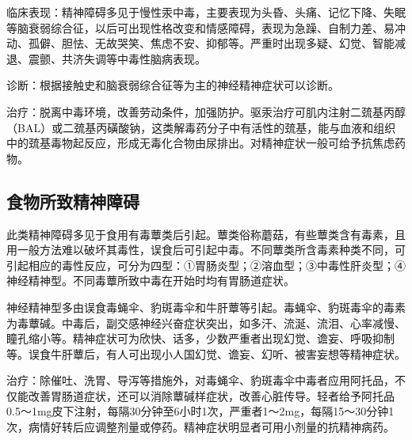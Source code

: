 临床表现：精神障碍多见于慢性汞中毒，主要表现为头昏、头痛、记忆下降、失眠等脑衰弱综合征，以后可出现性格改变和情感障碍，表现为急躁、自制力差、易冲动、孤僻、胆怯、无故哭笑、焦虑不安、抑郁等。严重时出现多疑、幻觉、智能减退、震颤、共济失调等中毒性脑病表现。

诊断：根据接触史和脑衰弱综合征等为主的神经精神症状可以诊断。

治疗：脱离中毒环境，改善劳动条件，加强防护。驱汞治疗可肌内注射二巯基丙醇（BAL）或二巯基丙磺酸钠，这类解毒药分子中有活性的巯基，能与血液和组织中的巯基毒物起反应，形成无毒化合物由尿排出。对精神症状一般可给予抗焦虑药物。

\subsection{食物所致精神障碍}

此类精神障碍多见于食用有毒蕈类后引起。蕈类俗称蘑菇，有些蕈类含有毒素，且用一般方法难以破坏其毒性，误食后可引起中毒。不同蕈类所含毒素种类不同，可引起相应的毒性反应，可分为四型：①胃肠炎型；②溶血型；③中毒性肝炎型；④神经精神型。不同毒蕈所致中毒在开始时均有胃肠道症状。

神经精神型多由误食毒蝇伞、豹斑毒伞和牛肝蕈等引起。毒蝇伞、豹斑毒伞的毒素为毒蕈碱。中毒后，副交感神经兴奋症状突出，如多汗、流涎、流泪、心率减慢、瞳孔缩小等。精神症状可为欣快、话多，少数严重者出现幻觉、谵妄、呼吸抑制等。误食牛肝蕈后，有人可出现小人国幻觉、谵妄、幻听、被害妄想等精神症状。

治疗：除催吐、洗胃、导泻等措施外，对毒蝇伞、豹斑毒伞中毒者应用阿托品，不仅能改善胃肠道症状，还可以消除蕈碱样症状，改善心脏传导。轻者给予阿托品0.5～1mg皮下注射，每隔30分钟至6小时1次，严重者1～2mg，每隔15～30分钟1次，病情好转后应调整剂量或停药。精神症状明显者可用小剂量的抗精神病药。